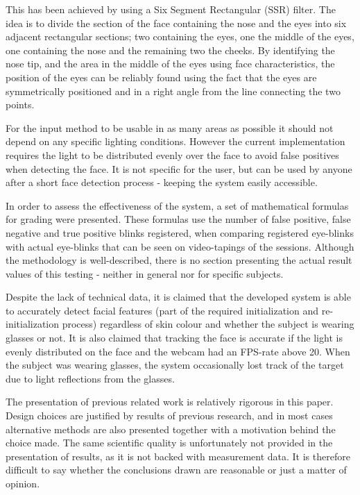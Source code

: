 \documentclass[a4paper,10pt]{article}
\begin{document}
This has been achieved by using a Six Segment Rectangular (SSR) filter\cite{ssr}. The idea is to divide the section of the face containing the nose and the eyes into six adjacent rectangular sections; two containing the eyes, one the middle of the eyes, one containing the nose and the remaining two the cheeks. By identifying the nose tip, and the area in the middle of the eyes using face characteristics, the position of the eyes can be reliably found using the fact that the eyes are symmetrically positioned and in a right angle from the line connecting the two points.

For the input method to be usable in as many areas as possible it should not depend on any specific lighting conditions. However the current implementation requires the light to be distributed evenly over the face to avoid false positives when detecting the face. It is not specific for the user, but can be used by anyone after a short face detection process - keeping the system easily accessible.

In order to assess the effectiveness of the system, a set of mathematical formulas for grading were presented. These formulas use the number of false positive, false negative and true positive blinks registered, when comparing registered eye-blinks with actual eye-blinks that can be seen on video-tapings of the sessions. Although the methodology is well-described, there is no section presenting the actual result values of this testing - neither in general nor for specific subjects.

Despite the lack of technical data, it is claimed that the developed system is able to accurately detect facial features (part of the required initialization and re-initialization process) regardless of skin colour and whether the subject is wearing glasses or not. It is also claimed that tracking the face is accurate if the light is evenly distributed on the face and the webcam had an FPS-rate above 20. When the subject was wearing glasses, the system occasionally lost track of the target due to light reflections from the glasses.

The presentation of previous related work is relatively rigorous in this paper. Design choices are justified by results of previous research, and in most cases alternative methods are also presented together with a motivation behind the choice made. The same scientific quality is unfortunately not provided in the presentation of results, as it is not backed with measurement data. It is therefore difficult to say whether the conclusions drawn are reasonable or just a matter of opinion.
\end{document}
